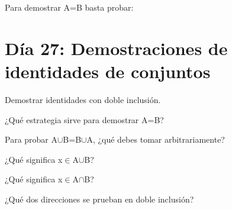 \begin{activity}[id=dia-26-opcion-02,type=choice,weight=1]

Para demostrar A=B basta probar:





\end{activity}

\section{Día 27: Demostraciones de identidades de conjuntos}

\begin{lesson}[id=dia-27-lectura,weight=0]

Demostrar identidades con doble inclusión.

\end{lesson}

\begin{activity}[id=dia-27-corta-01,type=short,weight=1]

¿Qué estrategia sirve para demostrar A=B?

\end{activity}

\begin{activity}[id=dia-27-corta-02,type=short,weight=1]

Para probar A\(\cup\)B=B\(\cup\)A, ¿qué debes tomar arbitrariamente?

\end{activity}

\begin{activity}[id=dia-27-corta-03,type=short,weight=1]

¿Qué significa x\(\in\)A\(\cup\)B?

\end{activity}

\begin{activity}[id=dia-27-corta-04,type=short,weight=1]

¿Qué significa x\(\in\)A\(\cap\)B?

\end{activity}

\begin{activity}[id=dia-27-corta-05,type=short,weight=1]

¿Qué dos direcciones se prueban en doble inclusión?

\end{activity}

